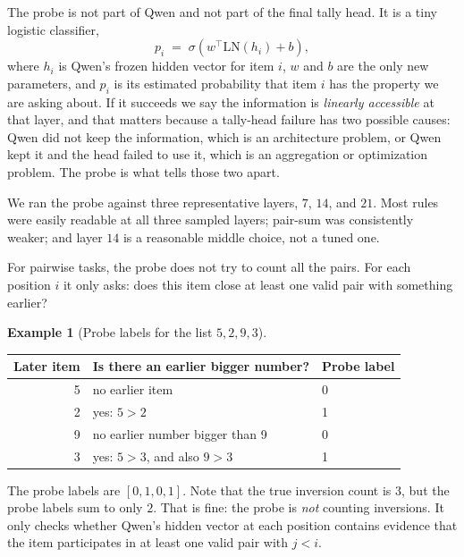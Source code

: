 \documentclass[10pt]{article}
\theoremstyle{definition}
\newtheorem{example}{Example}
\newcommand{\LN}{\mathrm{LN}}
\begin{document}
The probe is not part of Qwen and not part of the final tally head. It is a
tiny logistic classifier,
\begin{equation}
p_i \;=\; \sigma\!\left(w^{\top}\LN(h_i) + b\right),
\label{eq:probe}
\end{equation}
where $h_i$ is Qwen's frozen hidden vector for item $i$, $w$ and $b$ are the
only new parameters, and $p_i$ is its estimated probability that item $i$
has the property we are asking about. If it succeeds we say the information
is \emph{linearly accessible} at that layer, and that matters because a
tally-head failure has two possible causes: Qwen did not keep the
information, which is an architecture problem, or Qwen kept it and the head
failed to use it, which is an aggregation or optimization problem. The probe
is what tells those two apart.

We ran the probe against three representative layers, $7$, $14$, and $21$.
Most rules were easily readable at all three sampled layers; pair-sum was
consistently weaker; and layer $14$ is a reasonable middle choice, not a tuned one.

For pairwise tasks, the probe does not try to count all the pairs. For
each position $i$ it only asks: does this item close at least one valid
pair with something earlier?

\begin{example}[Probe labels for the list $5, 2, 9, 3$]
\label{ex:probe}
\begin{center}
\begin{tabular}{@{}rll@{}}
\toprule
\textbf{Later item} & \textbf{Is there an earlier bigger number?} & \textbf{Probe label} \\
\midrule
5 & no earlier item                     & 0 \\
2 & yes: $5 > 2$                        & 1 \\
9 & no earlier number bigger than 9     & 0 \\
3 & yes: $5 > 3$, and also $9 > 3$      & 1 \\
\bottomrule
\end{tabular}
\end{center}
\noindent The probe labels are $[0, 1, 0, 1]$. Note that the true inversion
count is $3$, but the probe labels sum to only $2$. That is fine: the probe
is \emph{not} counting inversions. It only checks whether Qwen's hidden
vector at each position contains evidence that the item participates in at
least one valid pair with $j < i$.
\end{example}
\end{document}
